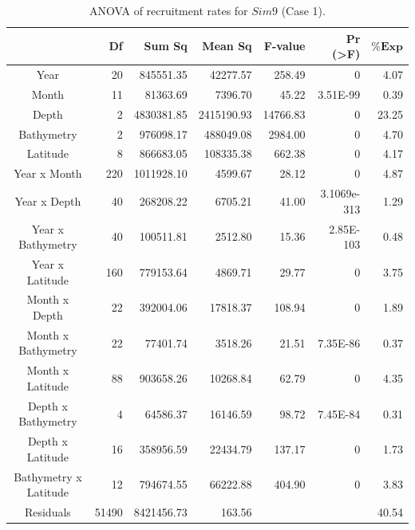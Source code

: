 \begin{table}[H]
\centering
\begin{adjustbox}{width=0.9\textwidth}
\small
\begin{tabular}{c|r|r|r|r|r|r}
\hline
                                  &
	\textbf{Df}                   &
	\textbf{Sum Sq}               &
	\textbf{Mean Sq}              &
	\textbf{F-value}    		   &
	\textbf{Pr (\textgreater{F})} &
	$\mathbf{\% Exp}$      \\
\hline
Year                  & 20	 & 845551.35  & 42277.57   & 258.49	   & 0	         & 4.07\\
Month                 & 11	 & 81363.69	  & 7396.70    & 45.22	   & 3.51E-99	 &0.39  \\
Depth                 & 2	 & 4830381.85 & 2415190.93 & 14766.83 & 0 			 & 23.25 \\
Bathymetry            & 2	 & 976098.17  & 488049.08  & 2984.00  & 0	         &4.70 \\
Latitude              & 8	 & 866683.05  & 108335.38  & 662.38	   & 0			 & 4.17\\
Year x Month          & 220 & 1011928.10 &	4599.67    & 28.12    & 0	         & 4.87  \\
Year x Depth          & 40	 & 268208.22  & 6705.21	   & 41.00	   & 3.1069e-313 & 1.29 \\
Year x Bathymetry     & 40  & 100511.81  & 2512.80	   & 15.36	   & 2.85E-103	 & 0.48 \\
Year x Latitude       & 160 & 779153.64  &	4869.71	   & 29.77	   & 0	         & 3.75  \\
Month x Depth         & 22	 & 392004.06  & 17818.37  &108.94	   & 0	         & 1.89 \\
Month x Bathymetry    & 22	 & 77401.74	  & 3518.26	   &21.51	   & 7.35E-86	 & 0.37  \\
Month x Latitude      & 88	 & 903658.26  & 10268.84  & 62.79	   & 0	         & 4.35  \\
Depth x Bathymetry    & 4	 & 64586.37	  & 16146.59   &98.72	   & 7.45E-84	 & 0.31  \\
Depth x Latitude      & 16	 & 358956.59  & 22434.79  & 137.17	   & 0	         &1.73 \\
Bathymetry x Latitude & 12	 & 794674.55  & 66222.88  & 404.90	   & 0	         & 3.83  \\
Residuals             & 51490	& 8421456.73 &163.56  & & 						 & 40.54\\
\hline
\end{tabular}
\end{adjustbox}
\caption{ANOVA of recruitment rates for $Sim 9$ (Case 1).}
\label{ANOVAsim9}
\end{table}

